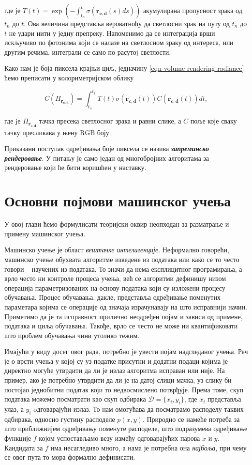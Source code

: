 \documentclass[12pt, a4paper, twoside]{book}
\numberwithin{equation}{chapter}
\numberwithin{theorem}{section}
\numberwithin{definition}{section}
\numberwithin{definitionChapter}{chapter}
\begin{document}
где је $T(t)=\exp{\left(-\int_{t_n}^{t}\sigma(\mathbf{r_{c, d}}(s)ds)\right)}$ акумулирана пропусност
зрака од $t_n$ до $t$. Ова величина представља вероватноћу да светлосни зрак на путу од $t_n$ до
$t$ не удари нити у једну препреку. Напоменимо да се интеграција врши искључиво по фотонима
који се налазе на светлосном зраку од интереса, или другим речима, интеграли се само по
расутој светлости.

Како нам је боја пиксела крајњи циљ, једначину \ref{eqn-volume-rendering-radiance} ћемо
преписати у колориметријском облику

\begin{equation}
	C(\Pi_{\mathbf{r_{c, d}}}) = \int_{t_n}^{t_f}T(t)\sigma(\mathbf{r_{c, d}}(t))C(\mathbf{r_{c, d}}(t))dt,
	\label{eqn-volume-rendering-colorimetry}
\end{equation}

где jе $\Pi_{\mathbf{r_{c, d}}}$ тачка пресека светлосног зрака и равни слике, а $C$ поље које сваку тачку
пресликава у њену RGB боју.

Приказани поступак одређивања боје пиксела се назива \textbf{\textit{запреминско рендеровање}}.
У питању је само један од многобројних алгоритама за рендеровање који ће бити коришћен у наставку.

\chapter{Основни појмови машинског учења}
У овој глави ћемо формулисати теоријски оквир неопходан за разматрање и примену машинског учења.

Машинско учење је област \textit{вештачке интелигенције}. Неформално говорећи, машинско учење
обухвата алгоритме изведене из података или како се то често говори -- научених из података.
То значи да нема експлицитног програмирања, а врло често ни контроле процеса учења, већ се
алгоритми дефинишу низом операција параметризованих на основу података који су изложени
процесу обучавања. Процес обучавања, дакле, представља одређивање поменутих параметара
којима се операције од значаја израчунавају на што исправнији начин. Приметимо да је та
исправност прилично неодређен појам и зависи од примене, података и циља обучавања. Такође,
врло се често не може ни квантификовати што проблем обучавања чини утолико тежим.

Имајући у виду досег овог рада, потребно је увести појам надгледаног учења. Реч је о врсти
учења у којој су уз податке присутни и додатни подаци којима је директно могуће утврдити
да ли је излаз алгоритма исправан или није. На пример, ако је потребно утврдити да ли је на
датој слици мачка, уз слику би постојао једнобитни податак који то недвосмислено потврђује.
Према томе, скуп података можемо посматрати као скуп одбирака $\mathcal{D}=\{x_i, y_i\}$,
где $x_i$ представља улаз, а $y_i$ oдговарајући излаз. То нам омогућава да посматрамо
расподелу таквих одбирака, односно густину расподеле $p(x, y)$. Природно се намеће потреба
за што приближнијем одређивању поменуте расподеле, што подразумева одређивање функције $f$
којом успостављамо везу између одговарајућих парова $x$ и $y$. Кандидата за $f$ има
несагледиво много, а нама је потребна она \textit{најбоља}, при чему се овог пута то мора
формално дефинисати.
\end{document}
